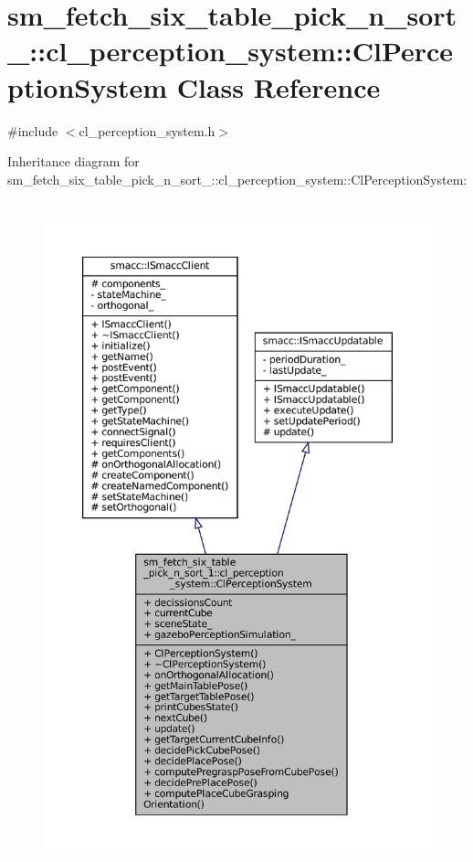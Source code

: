 \hypertarget{classsm__fetch__six__table__pick__n__sort__1_1_1cl__perception__system_1_1ClPerceptionSystem}{}\section{sm\+\_\+fetch\+\_\+six\+\_\+table\+\_\+pick\+\_\+n\+\_\+sort\+\_\+:\+:cl\+\_\+perception\+\_\+system\+:\+:Cl\+Perception\+System Class Reference}
\label{classsm__fetch__six__table__pick__n__sort__1_1_1cl__perception__system_1_1ClPerceptionSystem}


{\ttfamily \#include $<$cl\+\_\+perception\+\_\+system.\+h$>$}



Inheritance diagram for sm\+\_\+fetch\+\_\+six\+\_\+table\+\_\+pick\+\_\+n\+\_\+sort\+\_\+:\+:cl\+\_\+perception\+\_\+system\+:\+:Cl\+Perception\+System\+:
\nopagebreak
\begin{figure}[H]
\begin{center}
\leavevmode
\includegraphics[height=550pt]{classsm__fetch__six__table__pick__n__sort__1_1_1cl__perception__system_1_1ClPerceptionSystem__inherit__graph}
\end{center}
\end{figure}


